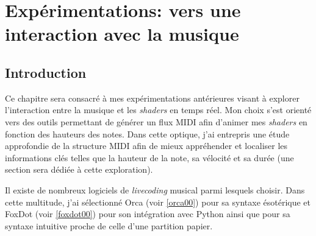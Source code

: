 \chapter{Expérimentations: vers une interaction avec la musique}





\section{Introduction}
Ce chapitre sera consacré à mes expérimentations antérieures visant à explorer l'interaction entre la musique et les \textit{shaders} en temps réel. Mon choix s'est orienté vers des outils permettant de générer un flux MIDI afin d'animer mes \textit{shaders} en fonction des hauteurs des notes. Dans cette optique, j'ai entrepris une étude approfondie de la structure MIDI afin de mieux appréhender et localiser les informations clés telles que la hauteur de la note, sa vélocité et sa durée (une section sera dédiée à cette exploration). 

Il existe de nombreux logiciels de \textit{livecoding} musical parmi lesquels choisir. Dans cette multitude, j'ai sélectionné Orca (voir \ref{orca00}) pour sa syntaxe ésotérique et FoxDot (voir \ref{foxdot00}) pour son intégration avec Python ainsi que pour sa syntaxe intuitive proche de celle d'une partition papier.

